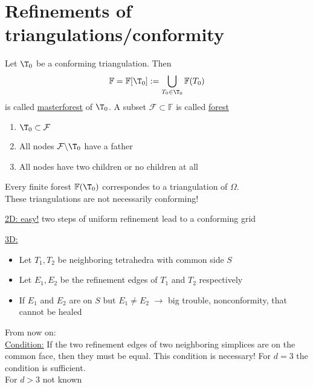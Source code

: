 \chapter{Refinements of triangulations/conformity}

\begin{definition}
	Let $\T_{0}$ be a conforming triangulation. Then 
	\begin{equation*}
		\mathbb{F} = \mathbb{F}[\T_{0}]:= \bigcup_{T_{0} \in \T_{0}} \mathbb{F}(T_{0})
	\end{equation*}
	is called \underline{masterforest} of $\T_{0}$.\nl
	A subset $\mathcal{F} \subset \mathbb{F}$ is called \underline{forest}
  	\begin{enumerate}[label= \arabic*)]
    	\item $\T_{0} \subset \mathcal{F}$ 
    	\item All nodes $\mathcal{F} \backslash \T_{0}$ have a father
    	\item All nodes have two children or no children at all
  	\end{enumerate}
	Every finite forest $\mathbb{F}(\T_{0})$ correspondes to a triangulation of $\Omega$.\\
  	These triangulations are not necessarily conforming! 
\end{definition}
\begin{example}
	\underline{2D: easy!} 
	two steps of uniform refinement lead to a conforming grid
	
	\underline{3D:}\\
	\begin{itemize}
	
		\item Let $T_{1},T_{2}$ be neighboring tetrahedra with common side $S$ 
		\item Let $E_{1},E_{2}$ be the refinement edges of $T_{1}$ and $T_{2}$ respectively
		\item If $E_{1}$ and $E_{2}$ are on $S$ but $E_{1}\neq E_{2}$ $\to$ big trouble, nonconformity, that cannot be healed
	\end{itemize}
\end{example}
From now on:\\
\underline{Condition:} If the two refinement edges of two neighboring simplices are on the common face, then they must be equal. This condition is necessary!\nl
For $d=3$ the condition is sufficient.\\
For $d>3$ not known\\
